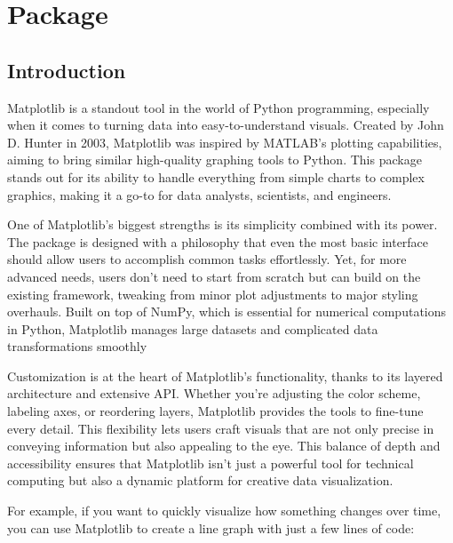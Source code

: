 %
%
%


\chapter{Package }


\section{Introduction}

Matplotlib is a standout tool in the world of Python programming, especially when it comes to turning data into easy-to-understand visuals. Created by John D. Hunter in 2003, Matplotlib was inspired by MATLAB’s plotting capabilities, aiming to bring similar high-quality graphing tools to Python. This package stands out for its ability to handle everything from simple charts to complex graphics, making it a go-to for data analysts, scientists, and engineers.

One of Matplotlib's biggest strengths is its simplicity combined with its power. The package is designed with a philosophy that even the most basic interface should allow users to accomplish common tasks effortlessly. Yet, for more advanced needs, users don't need to start from scratch but can build on the existing framework, tweaking from minor plot adjustments to major styling overhauls. Built on top of NumPy, which is essential for numerical computations in Python, Matplotlib manages large datasets and complicated data transformations smoothly

Customization is at the heart of Matplotlib’s functionality, thanks to its layered architecture and extensive API. Whether you're adjusting the color scheme, labeling axes, or reordering layers, Matplotlib provides the tools to fine-tune every detail. This flexibility lets users craft visuals that are not only precise in conveying information but also appealing to the eye. This balance of depth and accessibility ensures that Matplotlib isn’t just a powerful tool for technical computing but also a dynamic platform for creative data visualization\cite{Yim:2018}.

For example, if you want to quickly visualize how something changes over time, you can use Matplotlib to create a line graph with just a few lines of code:

